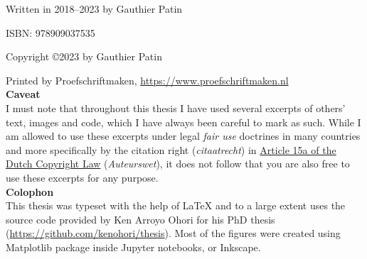 




           

  
            








\null%
\label{thesis:colophon}
\vfill
{}
Written in 2018--2023 by Gauthier Patin 

ISBN: 978909037535

Copyright \copyright \hspace{0.1cm}2023 by Gauthier Patin

Printed by Proefschriftmaken, \url{https://www.proefschriftmaken.nl}\\


\textbf{Caveat} \\
I must note that throughout this thesis I have used several excerpts of others' text, images and code, which I have always been careful to mark as such.
While I am allowed to use these excerpts under legal \emph{fair use} doctrines in many countries and more specifically by the citation right (\emph{citaatrecht}) in \href{http://wetten.overheid.nl/jci1.3:c:BWBR0001886&hoofdstuk=I&paragraaf=6&artikel=15a&z=2015-07-01&g=2015-07-01}{Article 15a of the Dutch Copyright Law} (\emph{Auteurswet}), it does not follow that you are also free to use these excerpts for any purpose.\\

\textbf{Colophon} \\
This thesis was typeset with the help of \LaTeX{} and to a large extent uses the source code provided by Ken Arroyo Ohori for his PhD thesis (\url{https://github.com/kenohori/thesis}). Most of the figures were created using Matplotlib package inside Jupyter notebooks, or Inkscape.

